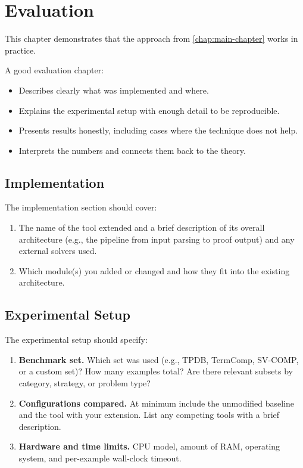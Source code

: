 \chapter{Evaluation}\label{chap:evaluation}

This chapter demonstrates that the approach from \cref{chap:main-chapter}
works in practice.

A good evaluation chapter:
\begin{itemize}
      \item Describes clearly what was implemented and where.
      \item Explains the experimental setup with enough detail to be reproducible.
      \item Presents results honestly, including cases where the technique does not help.
      \item Interprets the numbers and connects them back to the theory.
\end{itemize}

\section{Implementation}\label{sec:implementation}

The implementation section should cover:
\begin{enumerate}
    \item The name of the tool extended and a brief description of its overall
          architecture (e.g., the pipeline from input parsing to proof output)
          and any external solvers used.
    \item Which module(s) you added or changed and how they fit into the existing 
          architecture.
\end{enumerate}

\section{Experimental Setup}\label{sec:setup}

The experimental setup should specify:
\begin{enumerate}
    \item \textbf{Benchmark set.}
          Which set was used (e.g., TPDB, TermComp, SV-COMP, or a custom set)?
          How many examples total?  
          Are there relevant subsets by category, strategy, or problem type?

    \item \textbf{Configurations compared.}
          At minimum include the unmodified baseline and the tool with your
          extension. 
          List any competing tools with a brief description.

    \item \textbf{Hardware and time limits.}
          CPU model, amount of RAM, operating system, and per-example
          wall-clock timeout.
\end{enumerate}

